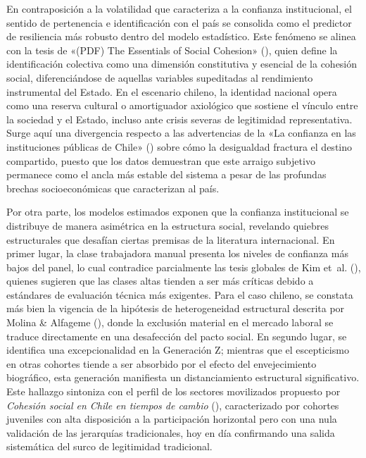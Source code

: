 \documentclass[
  spanish,
  a4paper,
  oneside]{scrbook}
\begin{document}
En contraposición a la volatilidad que caracteriza a la confianza
institucional, el sentido de pertenencia e identificación con el país se
consolida como el predictor de resiliencia más robusto dentro del modelo
estadístico. Este fenómeno se alinea con la tesis de {«({PDF}) {The
Essentials} of {Social Cohesion}»}
(), quien define la identificación
colectiva como una dimensión constitutiva y esencial de la cohesión
social, diferenciándose de aquellas variables supeditadas al rendimiento
instrumental del Estado. En el escenario chileno, la identidad nacional
opera como una reserva cultural o amortiguador axiológico que sostiene
el vínculo entre la sociedad y el Estado, incluso ante crisis severas de
legitimidad representativa. Surge aquí una divergencia respecto a las
advertencias de la {«{La confianza en las instituciones públicas de
Chile}»} () sobre cómo la
desigualdad fractura el destino compartido, puesto que los datos
demuestran que este arraigo subjetivo permanece como el ancla más
estable del sistema a pesar de las profundas brechas socioeconómicas que
caracterizan al país.

Por otra parte, los modelos estimados exponen que la confianza
institucional se distribuye de manera asimétrica en la estructura
social, revelando quiebres estructurales que desafían ciertas premisas
de la literatura internacional. En primer lugar, la clase trabajadora
manual presenta los niveles de confianza más bajos del panel, lo cual
contradice parcialmente las tesis globales de Kim et~al.
(), quienes sugieren que las clases
altas tienden a ser más críticas debido a estándares de evaluación
técnica más exigentes. Para el caso chileno, se constata más bien la
vigencia de la hipótesis de heterogeneidad estructural descrita por
Molina \& Alfageme (), donde
la exclusión material en el mercado laboral se traduce directamente en
una desafección del pacto social. En segundo lugar, se identifica una
excepcionalidad en la Generación Z; mientras que el escepticismo en
otras cohortes tiende a ser absorbido por el efecto del envejecimiento
biográfico, esta generación manifiesta un distanciamiento estructural
significativo. Este hallazgo sintoniza con el perfil de los sectores
movilizados propuesto por \emph{{Cohesión social en Chile en tiempos de
cambio}} (), caracterizado por
cohortes juveniles con alta disposición a la participación horizontal
pero con una nula validación de las jerarquías tradicionales, hoy en día
confirmando una salida sistemática del surco de legitimidad tradicional.
\end{document}
